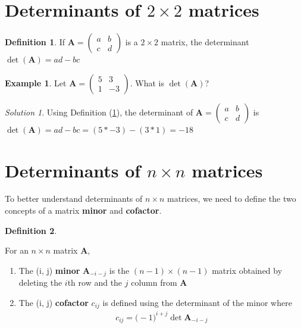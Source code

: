\documentclass[
]{book}
\theoremstyle{definition}
\newtheorem{definition}{Definition}[chapter]
\theoremstyle{definition}
\newtheorem{example}{Example}[chapter]
\theoremstyle{definition}
\theoremstyle{definition}
\theoremstyle{remark}
\newtheorem*{solution}{Solution}
\begin{document}
\hypertarget{determinants-of-2-times-2-matrices}{%
\section{\texorpdfstring{Determinants of \(2 \times 2\) matrices}{Determinants of 2 \textbackslash times 2 matrices}}\label{determinants-of-2-times-2-matrices}}

\begin{definition}
\protect\hypertarget{def:det22}{}\label{def:det22}If \(\mathbf{A} = \begin{pmatrix} a & b \\ c & d \end{pmatrix}\) is a \(2 \times 2\) matrix, the determinant \(\operatorname{det}(\mathbf{A}) = ad - bc\)
\end{definition}

\begin{example}
Let \(\mathbf{A} = \begin{pmatrix} 5 & 3 \\ 1 & -3 \end{pmatrix}\). What is \(\det(\mathbf{A})\)?
\end{example}

\begin{solution}
Using Definition (\ref{def:det22}), the determinant of \(\mathbf{A} = \begin{pmatrix} a & b \\ c & d \end{pmatrix}\) is \(\det(\mathbf{A}) = ad - bc= (5 * -3) - (3 * 1) = -18\)
\end{solution}

\hypertarget{determinants-of-n-times-n-matrices}{%
\section{\texorpdfstring{Determinants of \(n \times n\) matrices}{Determinants of n \textbackslash times n matrices}}\label{determinants-of-n-times-n-matrices}}

To better understand determinants of \(n \times n\) matrices, we need to define the two concepts of a matrix \textbf{minor} and \textbf{cofactor}.

\begin{definition}
\protect\hypertarget{def:minor-cofactor}{}\label{def:minor-cofactor}

For an \(n \times n\) matrix \(\mathbf{A}\),

\begin{enumerate}
\def\labelenumi{\alph{enumi})}
\item
  The (i, j) \textbf{minor} \(\mathbf{A}_{-i-j}\) is the \((n-1) \times (n-1)\) matrix obtained by deleting the \(i\)th row and the \(j\) column from \(\mathbf{A}\)
\item
  The (i, j) \textbf{cofactor} \(c_{ij}\) is defined using the determinant of the minor where
  \[
  \begin{aligned}
  c_{ij} = \mathbf(-1)^{i + j} \det{\mathbf{A}_{-i-j}}
  \end{aligned}
  \]
\end{enumerate}

\end{definition}
\end{document}
